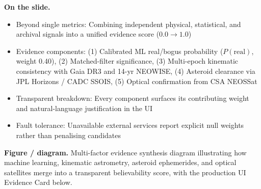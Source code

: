 \documentclass[11pt,a4paper]{article}
\begin{document}
\textbf{On the slide.}
\begin{itemize}[leftmargin=1.4em,itemsep=1.5pt,topsep=1.5pt]
\item Beyond single metrics: Combining independent physical, statistical, and archival signals into a unified evidence score ($0.0 \to 1.0$)
\item Evidence components: (1) Calibrated ML real/bogus probability ($P(\mathrm{real})$, weight 0.40), (2) Matched-filter significance, (3) Multi-epoch kinematic consistency with Gaia DR3 and 14-yr NEOWISE, (4) Asteroid clearance via JPL Horizons / CADC SSOIS, (5) Optical confirmation from CSA NEOSSat
\item Transparent breakdown: Every component surfaces its contributing weight and natural-language justification in the UI
\item Fault tolerance: Unavailable external services report explicit null weights rather than penalising candidates
\end{itemize}

\textbf{Figure / diagram.} Multi-factor evidence synthesis diagram illustrating how machine learning, kinematic astrometry, asteroid ephemerides, and optical satellites merge into a transparent believability score, with the production UI Evidence Card below.
\end{document}
